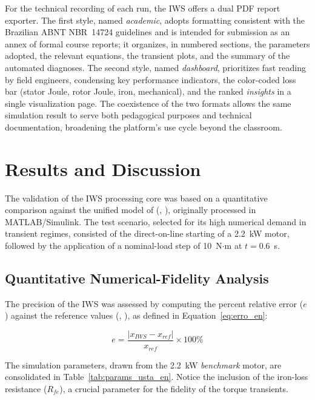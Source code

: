 \documentclass[a4paper]{ifacconf}
\begin{document}
For the technical recording of each run, the IWS offers a dual PDF report exporter. The first style, named \textit{academic}, adopts formatting consistent with the Brazilian ABNT NBR~14724 guidelines and is intended for submission as an annex of formal course reports; it organizes, in numbered sections, the parameters adopted, the relevant equations, the transient plots, and the summary of the automated diagnoses. The second style, named \textit{dashboard}, prioritizes fast reading by field engineers, condensing key performance indicators, the color-coded loss bar (stator Joule, rotor Joule, iron, mechanical), and the ranked \textit{insights} in a single visualization page. The coexistence of the two formats allows the same simulation result to serve both pedagogical purposes and technical documentation, broadening the platform's use cycle beyond the classroom.

\section{Results and Discussion}

The validation of the IWS processing core was based on a quantitative comparison against the unified model of (\citeauthor{usta2024mathematical}, \citeyear{usta2024mathematical}), originally processed in MATLAB/Simulink. The test scenario, selected for its high numerical demand in transient regimes, consisted of the direct-on-line starting of a 2.2~kW motor, followed by the application of a nominal-load step of 10~N$\cdot$m at $t = 0.6$~s.

\subsection{Quantitative Numerical-Fidelity Analysis}

The precision of the IWS was assessed by computing the percent relative error ($e$) against the reference values (\citeauthor{usta2024mathematical}, \citeyear{usta2024mathematical}), as defined in Equation~\ref{eq:erro_en}:

\begin{equation}
e = \frac{|x_{IWS} - x_{ref}|}{x_{ref}} \times 100\%
\label{eq:erro_en}
\end{equation}

The simulation parameters, drawn from the 2.2~kW \textit{benchmark} motor, are consolidated in Table~\ref{tab:params_usta_en}. Notice the inclusion of the iron-loss resistance ($R_{fe}$), a crucial parameter for the fidelity of the torque transients.
\end{document}
